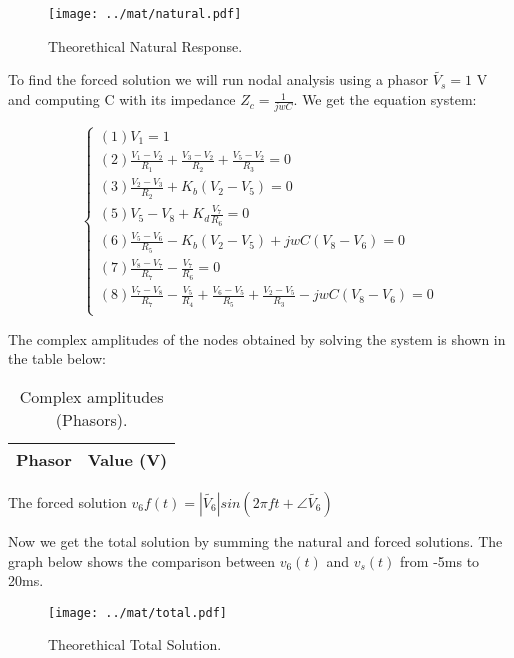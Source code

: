 \begin{figure}[H] \centering
\texttt{[image: ../mat/natural.pdf]}
\caption{Theorethical Natural Response.}
\label{fig:sim_op}
\end{figure}


To find the forced solution we will run nodal analysis using a phasor $\widetilde{V_s}=1$ V and computing C with its impedance $Z_c=\frac{1}{jwC}$. We get the equation system:

\begin{equation}\label{eq:nodeForced}
  \begin{cases}
  (1) V_1 = 1 \\
  (2) \frac{V_1 - V_2}{R_1} + \frac{V_3 - V_2}{R_2} + \frac{V_5 - V_2}{R_3} = 0 \\
  (3) \frac{V_2 - V_3}{R_2} + K_b(V_2 - V_5) = 0 \\
  (5) V_5 - V_8 + K_d\frac{V_7}{R_6} = 0 \\
  (6) \frac{V_5 - V_6}{R_5} - K_b(V_2-V_5) + jwC(V_8-V_6)= 0 \\
  (7) \frac{V_8 - V_7}{R_7} - \frac{V_7}{R_6} = 0 \\
  (8) \frac{V_7 - V_8}{R_7} - \frac{V_5}{R_4} + \frac{V_6 - V_5}{R_5} + \frac{V_2 - V_5}{R_3} - jwC(V_8-V_6) = 0 \\
\end{cases}
\end{equation}

The complex amplitudes of the nodes obtained by solving the system is shown in the table below:

\begin{table}[H]
  \centering
  \begin{tabular}{|l|r|}
    \hline
        {\bf Phasor} & {\bf Value (V)} \\ \hline
        
  \end{tabular}
  \caption{Complex amplitudes (Phasors).}
  \label{tab:comp}
\end{table}
\par

The forced solution $v_6f(t)= |\widetilde{V_6}|sin(2\pi ft + \angle \widetilde{V_6})$

Now we get the total solution by summing the natural and forced solutions.
The graph below shows the comparison between $v_6(t)$ and $v_s(t)$ from -5ms to 20ms.

\begin{figure}[H] \centering
\texttt{[image: ../mat/total.pdf]}
\caption{Theorethical Total Solution.}
\label{fig:sim_op}
\end{figure}


